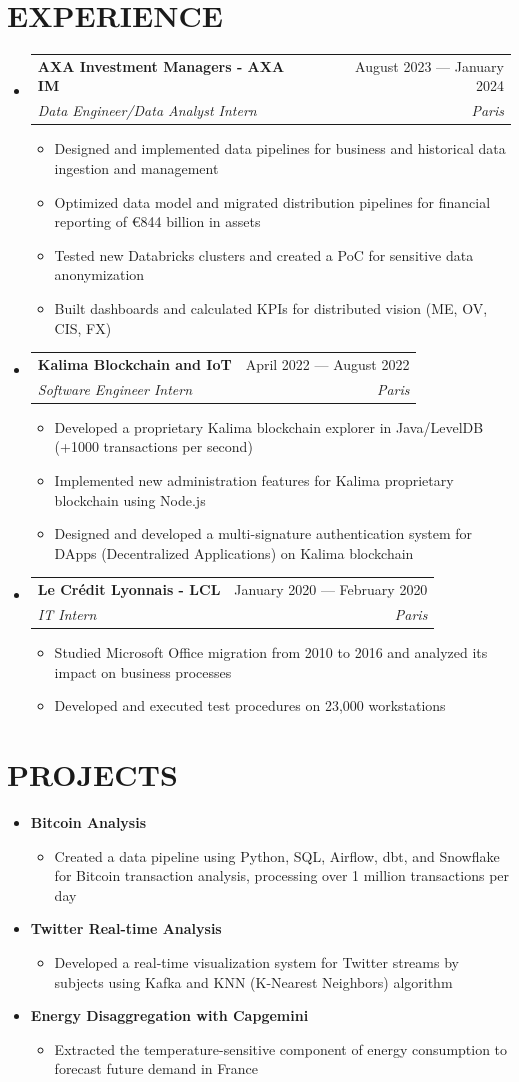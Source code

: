 \documentclass[11pt,a4paper]{article}
\makeatletter
\newcommand{\resumeItem}[1]{
  \item\footnotesize{
    {#1 \vspace{-1pt}}
  }
}
\newcommand{\resumeSubheading}[4]{
  \vspace{2pt}\item
    \begin{tabular*}{\textwidth}[t]{l@{\extracolsep{\fill}}r}
      {\footnotesize\textbf{#1}} & {\footnotesize#2} \\
      {\footnotesize\textit{#3}} & {\footnotesize\textit{#4}} \\
    \end{tabular*}\vspace{2pt}
}
\newcommand{\resumeProjectHeading}[2]{
  \item
  {\footnotesize#1} \hfill {#2}
}
\newcommand{\resumeSubHeadingListStart}{\begin{itemize}[leftmargin=0in, label={}]}
\newcommand{\resumeSubHeadingListEnd}{\end{itemize}}
\newcommand{\resumeItemListStart}{\begin{itemize}[label={\textbullet}]}
\newcommand{\resumeItemListEnd}{\end{itemize}\vspace{0pt}}
\makeatother
\begin{document}
\section{EXPERIENCE}
\resumeSubHeadingListStart
    \resumeSubheading
      {AXA Investment Managers - AXA IM}{August 2023 --- January 2024}
      {Data Engineer/Data Analyst Intern}{Paris}
      \resumeItemListStart
        \resumeItem{Designed and implemented data pipelines for business and historical data ingestion and management}
        \resumeItem{Optimized data model and migrated distribution pipelines for financial reporting of €844 billion in assets}
        \resumeItem{Tested new Databricks clusters and created a PoC for sensitive data anonymization}
        \resumeItem{Built dashboards and calculated KPIs for distributed vision (ME, OV, CIS, FX)}
      \resumeItemListEnd
    \resumeSubheading
      {Kalima Blockchain and IoT}{April 2022 --- August 2022}
      {Software Engineer Intern}{Paris}
      \resumeItemListStart
        \resumeItem{Developed a proprietary Kalima blockchain explorer in Java/LevelDB (+1000 transactions per second)}
        \resumeItem{Implemented new administration features for Kalima proprietary blockchain using Node.js}
        \resumeItem{Designed and developed a multi-signature authentication system for DApps (Decentralized Applications) on Kalima blockchain}
      \resumeItemListEnd
    \resumeSubheading
      {Le Crédit Lyonnais - LCL}{January 2020 --- February 2020}
      {IT Intern}{Paris}
      \resumeItemListStart
        \resumeItem{Studied Microsoft Office migration from 2010 to 2016 and analyzed its impact on business processes}
        \resumeItem{Developed and executed test procedures on 23,000 workstations}
      \resumeItemListEnd
  \resumeSubHeadingListEnd

\section{PROJECTS}
\resumeSubHeadingListStart
    \resumeProjectHeading
      {\textbf{Bitcoin Analysis}} {}
      \resumeItemListStart
        \resumeItem{Created a data pipeline using Python, SQL, Airflow, dbt, and Snowflake for Bitcoin transaction analysis, processing over 1 million transactions per day}
      \resumeItemListEnd
    \resumeProjectHeading
      {\textbf{Twitter Real-time Analysis}} {}
      \resumeItemListStart
        \resumeItem{Developed a real-time visualization system for Twitter streams by subjects using Kafka and KNN (K-Nearest Neighbors) algorithm}
      \resumeItemListEnd
    \resumeProjectHeading
      {\textbf{Energy Disaggregation with Capgemini}} {}
      \resumeItemListStart
        \resumeItem{Extracted the temperature-sensitive component of energy consumption to forecast future demand in France}
      \resumeItemListEnd
\resumeSubHeadingListEnd
\end{document}
